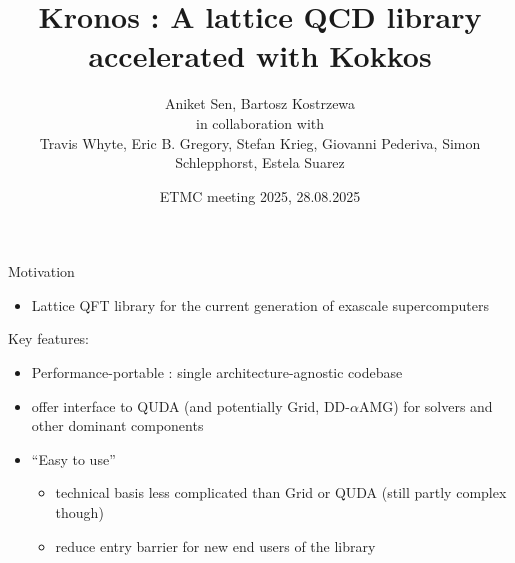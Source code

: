 

\graphicspath{{graphics/}}

\title[Kronos]{Kronos : A lattice QCD library accelerated with Kokkos}
\author[A. Sen, B. Kostrzewa]{Aniket Sen, Bartosz Kostrzewa  \\ \vspace{0.2cm} in collaboration with \\ \vspace{0.2cm} \centering Travis Whyte, Eric B. Gregory, Stefan Krieg, Giovanni Pederiva, Simon Schlepphorst, Estela Suarez}
\date[ETMC meeting 2025]{\small ETMC meeting 2025, 28.08.2025}
\subject{subject}




\begin{frame}
  \titlepage{}
\end{frame}


\begin{frame}{Motivation}
  \begin{itemize}
    \item Lattice QFT library for the current generation of exascale supercomputers
  \end{itemize} 
  \vspace{0.5cm}
  Key features: \\
  \begin{itemize}
    \item Performance-portable : single architecture-agnostic codebase
    \vspace{0.6cm}
    \item offer interface to QUDA (and potentially Grid, DD-$\alpha$AMG) for solvers and other dominant components
    \vspace{0.6cm}
    \item ``Easy to use''
    \vspace{0.3cm}
    \begin{itemize}
      \item technical basis less complicated than Grid or QUDA (still partly complex though)
      \vspace{0.6cm}
      \item reduce entry barrier for new end users of the library
    \end{itemize}
  \end{itemize}
\end{frame}


